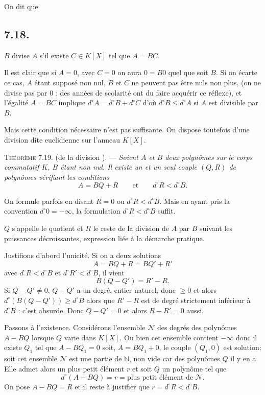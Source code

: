 On dit que

\subsection*{7.18.}

$B$ divise $A$ s'il existe $C\in K[X]$ tel que $A=BC$.

Il est clair que si $A=0$, avec $C=0$ on aura $0=B0$ quel que soit $B$. Si on écarte ce cas, $A$ étant supposé non nul, $B$ et $C$ ne peuvent pas être nuls non plus, (on ne divise pas par 0 : des années de scolarité ont du faire acquérir ce réflexe), et l'égalité $A=BC$ implique $d^\circ A=d^\circ B+d^\circ C$ d'où $d^\circ B\le d^\circ A$ si $A$ est divisible par $B$.

Mais cette condition nécessaire n'est pas suffisante. On dispose toutefois d'une division dite euclidienne sur l'anneau $K[X]$.

\medskip\noindent\textsc{Théorème 7.19.} (de la division ). --- \emph{Soient $A$ et $B$ deux polynômes sur le corps commutatif $K$, $B$ étant non nul. Il existe un et un seul couple $(Q,R)$ de polynômes vérifiant les conditions
\[
A=BQ+R\qquad\text{et}\qquad d^\circ R<d^\circ B.
\]}

On formule parfois en disant $R=0$ ou $d^\circ R<d^\circ B$. Mais en ayant pris la convention $d^\circ0=-\infty$, la formulation $d^\circ R<d^\circ B$ suffit.

$Q$ s'appelle le quotient et $R$ le reste de la division de $A$ par $B$ suivant les puissances décroissantes, expression liée à la démarche pratique.

Justifions d'abord l'unicité. Si on a deux solutions
\[
A=BQ+R=BQ'+R'
\]
avec $d^\circ R<d^\circ B$ et $d^\circ R'<d^\circ B$, il vient
\[
B(Q-Q')=R'-R.
\]
Si $Q-Q'\ne0$, $Q-Q'$ a un degré, entier naturel, donc $\ge0$ et alors $d^\circ(B(Q-Q'))\ge d^\circ B$ alors que $R'-R$ est de degré strictement inférieur à $d^\circ B$ : c'est absurde. Donc $Q-Q'=0$ et alors $R-R'=0$ aussi.

Passons à l'existence. Considérons l'ensemble $\mathcal N$ des degrés des polynômes $A-BQ$ lorsque $Q$ varie dans $K[X]$. Ou bien cet ensemble contient $-\infty$ donc il existe $Q_1$ tel que $A-BQ_1=0$ soit, $A=BQ_1+0$, le couple $(Q_1,0)$ est solution; soit cet ensemble $\mathcal N$ est une partie de $\mathbb N$, non vide car des polynômes $Q$ il y en a. Elle admet alors un plus petit élément $r$ et soit $Q$ un polynôme tel que
\[
d^\circ(A-BQ)=r=\text{plus petit élément de }\mathcal N.
\]
On pose $A-BQ=R$ et il reste à justifier que $r=d^\circ R<d^\circ B$.

